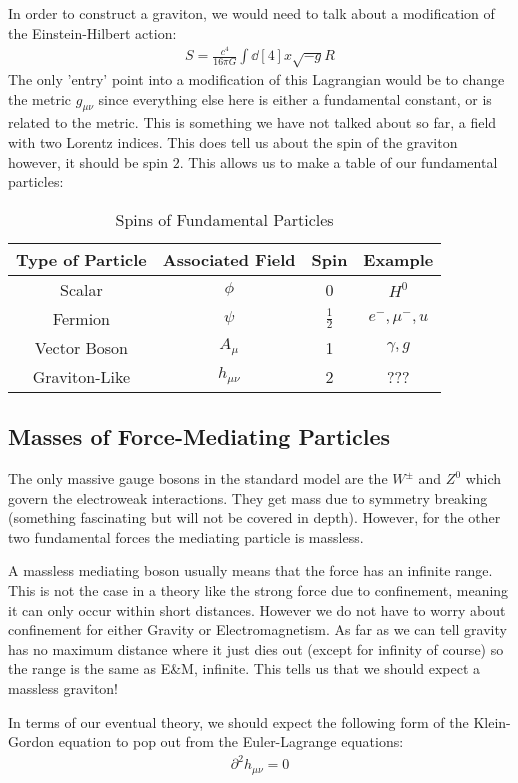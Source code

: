 \documentclass[12pt]{article}
\newcommand{\D}{\partial}
\newcommand{\ddst}{\dd[4]{x}}
\newcommand{\munu}{{\mu\nu}}
\begin{document}
In order to construct a graviton, we would need to talk about a modification of the Einstein-Hilbert action:
\begin{align*}
  S=\frac{c^4}{16\pi G}\int\ddst\sqrt{-g}R
\end{align*}
The only 'entry' point into a modification of this Lagrangian would be to change the metric $g_\munu$ since everything else here is either a fundamental constant, or is related to the metric. This is something we have not talked about so far, a field with two Lorentz indices. This does tell us about the spin of the graviton however, it should be spin $2$. This allows us to make a table of our fundamental particles:
\begin{table}[H]
  \centering
  \begin{tabular}{c|c|c|c}
    Type of Particle&Associated Field&Spin&Example\\\hline
    Scalar&$\phi$&0&$H^0$\\
    Fermion&$\psi$&$\frac{1}{2}$&$e^-,\mu^-,u$\\
    Vector Boson&$A_\mu$&1&$\gamma,g$\\
    Graviton-Like&$h_\munu$&2&???
  \end{tabular}
  \caption{Spins of Fundamental Particles}
  \label{tab:1}
\end{table}
\subsection{Masses of Force-Mediating Particles}
The only massive gauge bosons in the standard model are the $W^\pm$ and $Z^0$ which govern the electroweak interactions. They get mass due to symmetry breaking (something fascinating but will not be covered in depth). However, for the other two fundamental forces the mediating particle is massless.

A massless mediating boson usually means that the force has an infinite range. This is not the case in a theory like the strong force due to confinement, meaning it can only occur within short distances. However we do not have to worry about confinement for either Gravity or Electromagnetism. As far as we can tell gravity has no maximum distance where it just dies out (except for infinity of course) so the range is the same as E\&M, infinite. This tells us that we should expect a massless graviton!

In terms of our eventual theory, we should expect the following form of the Klein-Gordon equation to pop out from the Euler-Lagrange equations:
\begin{align*}
  \D^2h_\munu=0
\end{align*}
\end{document}
